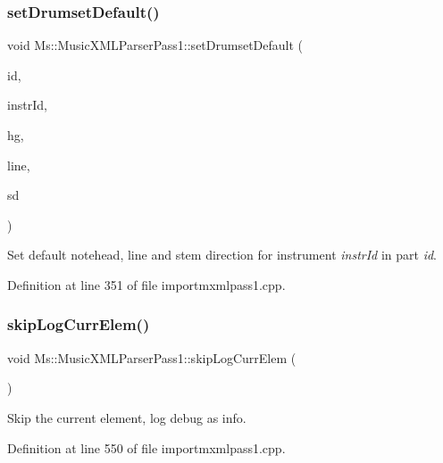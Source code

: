 \subsubsection{\texorpdfstring{set\+Drumset\+Default()}{setDrumsetDefault()}}
{\footnotesize\ttfamily void Ms\+::\+Music\+X\+M\+L\+Parser\+Pass1\+::set\+Drumset\+Default (\begin{DoxyParamCaption}\item[{const Q\+String \&}]{id,  }\item[{const Q\+String \&}]{instr\+Id,  }\item[{const Note\+Head\+::\+Group}]{hg,  }\item[{const int}]{line,  }\item[{const \hyperlink{class_ms_1_1_direction}{Direction}}]{sd }\end{DoxyParamCaption})}

Set default notehead, line and stem direction for instrument {\itshape instr\+Id} in part {\itshape id}. 

Definition at line 351 of file importmxmlpass1.\+cpp.

\mbox{\label{class_ms_1_1_music_x_m_l_parser_pass1_a82c648499fd4e880204c669a7ee3cc20}} 
\subsubsection{\texorpdfstring{skip\+Log\+Curr\+Elem()}{skipLogCurrElem()}}
{\footnotesize\ttfamily void Ms\+::\+Music\+X\+M\+L\+Parser\+Pass1\+::skip\+Log\+Curr\+Elem (\begin{DoxyParamCaption}{ }\end{DoxyParamCaption})}

Skip the current element, log debug as info. 

Definition at line 550 of file importmxmlpass1.\+cpp.

\mbox{\label{class_ms_1_1_music_x_m_l_parser_pass1_ae6bb7941967664f45789078847af96c4}} 

